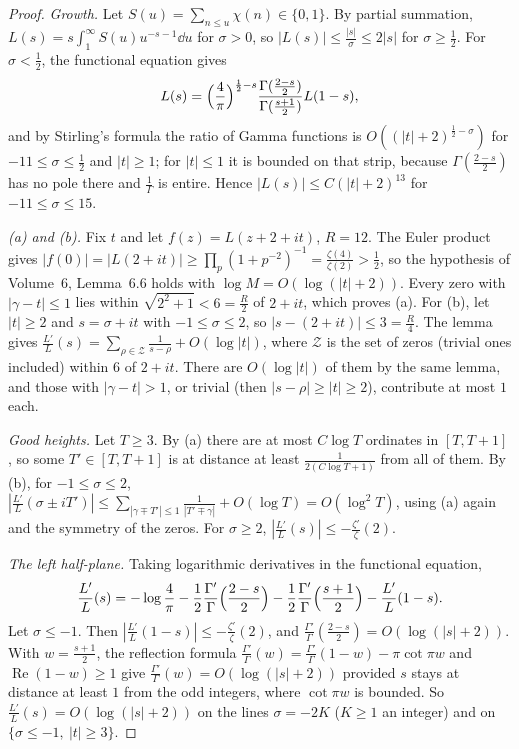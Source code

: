 \begin{proof}
\emph{Growth.} Let $S(u)=\sum_{n\le u}\chi(n)\in\{0,1\}$. By partial summation, $L(s)=s\int_1^\infty S(u)u^{-s-1}\dd u$ for $\sigma>0$, so $|L(s)|\le\frac{|s|}\sigma\le2|s|$ for $\sigma\ge\frac12$. For $\sigma<\frac12$, the functional equation gives
\[
L(s)=\Bigl(\frac4\pi\Bigr)^{\frac12-s}\frac{\Gamma(\frac{2-s}2)}{\Gamma(\frac{s+1}2)}L(1-s),
\]
and by Stirling's formula the ratio of Gamma functions is $O((|t|+2)^{\frac12-\sigma})$ for $-11\le\sigma\le\frac12$ and $|t|\ge1$; for $|t|\le1$ it is bounded on that strip, because $\Gamma(\frac{2-s}2)$ has no pole there and $\frac1\Gamma$ is entire. Hence $|L(s)|\le C(|t|+2)^{13}$ for $-11\le\sigma\le15$.

\emph{(a) and (b).} Fix $t$ and let $f(z)=L(z+2+it)$, $R=12$. The Euler product gives $|f(0)|=|L(2+it)|\ge\prod_p(1+p^{-2})^{-1}=\frac{\zeta(4)}{\zeta(2)}>\frac12$, so the hypothesis of Volume~6, Lemma~6.6 holds with $\log M=O(\log(|t|+2))$. Every zero with $|\gamma-t|\le1$ lies within $\sqrt{2^2+1}<6=\frac R2$ of $2+it$, which proves (a). For (b), let $|t|\ge2$ and $s=\sigma+it$ with $-1\le\sigma\le2$, so $|s-(2+it)|\le3=\frac R4$. The lemma gives $\frac{L'}L(s)=\sum_{\rho\in\mathcal Z}\frac1{s-\rho}+O(\log|t|)$, where $\mathcal Z$ is the set of zeros (trivial ones included) within $6$ of $2+it$. There are $O(\log|t|)$ of them by the same lemma, and those with $|\gamma-t|>1$, or trivial (then $|s-\rho|\ge|t|\ge2$), contribute at most $1$ each.

\emph{Good heights.} Let $T\ge3$. By (a) there are at most $C\log T$ ordinates in $[T,T+1]$, so some $T'\in[T,T+1]$ is at distance at least $\frac1{2(C\log T+1)}$ from all of them. By (b), for $-1\le\sigma\le2$, $|\frac{L'}L(\sigma\pm iT')|\le\sum_{|\gamma\mp T'|\le1}\frac1{|T'\mp\gamma|}+O(\log T)=O(\log^2T)$, using (a) again and the symmetry of the zeros. For $\sigma\ge2$, $|\frac{L'}L(s)|\le-\frac{\zeta'}\zeta(2)$.

\emph{The left half-plane.} Taking logarithmic derivatives in the functional equation,
\[
\frac{L'}L(s)=-\log\frac4\pi-\frac12\frac{\Gamma'}\Gamma\Bigl(\frac{2-s}2\Bigr)-\frac12\frac{\Gamma'}\Gamma\Bigl(\frac{s+1}2\Bigr)-\frac{L'}L(1-s).
\]
Let $\sigma\le-1$. Then $|\frac{L'}L(1-s)|\le-\frac{\zeta'}\zeta(2)$, and $\frac{\Gamma'}\Gamma(\frac{2-s}2)=O(\log(|s|+2))$. With $w=\frac{s+1}2$, the reflection formula $\frac{\Gamma'}\Gamma(w)=\frac{\Gamma'}\Gamma(1-w)-\pi\cot\pi w$ and $\operatorname{Re}(1-w)\ge1$ give $\frac{\Gamma'}\Gamma(w)=O(\log(|s|+2))$ provided $s$ stays at distance at least $1$ from the odd integers, where $\cot\pi w$ is bounded. So $\frac{L'}L(s)=O(\log(|s|+2))$ on the lines $\sigma=-2K$ ($K\ge1$ an integer) and on $\{\sigma\le-1,\ |t|\ge3\}$.


\end{proof}
